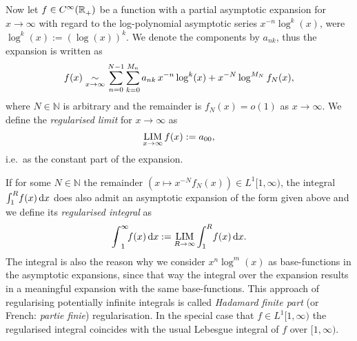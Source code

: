 Now let $f\in\Cinf(\Rplus)$ be a function with a partial asymptotic expansion
for $x\to\infty$ with regard to the log-polynomial asymptotic series
$x^{-n}\log^k(x)$, were $\log^k(x) := (\log(x))^k$. We denote the components by
$a_{nk}$, thus the expansion is written as
\begin{equation*}
  f(x) \SimAs{x\to\infty} \sum_{n=0}^{N-1}\sum_{k=0}^{M_n}
  a_{nk}\,x^{-n}\log^k(x) + x^{-N}\log^{M_N}f_N(x),
\end{equation*}
where $N\in\mathbb{N}$ is arbitrary and the remainder is $f_N(x) = o(1)$ as
$x\to\infty$. We define the \emph{regularised limit} for $x\to\infty$ as
\begin{equation}
  \Reglim_{x\to\infty} f(x) := a_{00},
\end{equation}
i.e.\ as the constant part of the expansion.

If for some $N\in\mathbb{N}$ the remainder $(x\mapsto x^{-N}f_N(x))\in
L^1[1,\infty)$, the integral $\Integ[R]{1}{x}{f(x)}$ does also admit an
asymptotic expansion of the form given above and we define its \emph{regularised
integral} as
\begin{equation}
  \Regint{x}{f(x)} := \Reglim_{R\to\infty}\Integ[R]{1}{x}{f(x)}.
\end{equation}
The integral is also the reason why we consider $x^n \log^m(x)$ as
base-functions in the asymptotic expansions, since that way the integral over
the expansion results in a meaningful expansion with the same base-functions.
This approach of regularising potentially infinite integrals is called
\emph{Hadamard finite part} (or French: \textit{partie finie}) regularisation.
In the special case that $f\in L^1[1,\infty)$ the regularised integral coincides
with the usual Lebesgue integral of $f$ over $[1,\infty)$.

